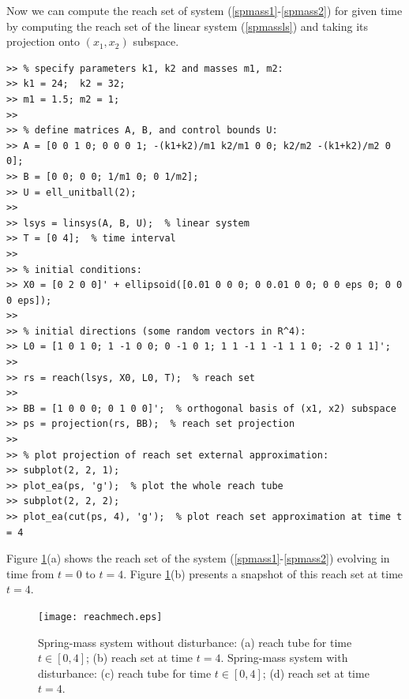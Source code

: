 \documentclass{report}
\begin{document}
Now we can compute the reach set of system (\ref{spmass1}-\ref{spmass2})
for given time by computing the reach set of the linear system (\ref{spmassls})
and taking its projection onto $(x_1, x_2)$ subspace.
{\tt \begin{verbatim}
>> % specify parameters k1, k2 and masses m1, m2:
>> k1 = 24;  k2 = 32;
>> m1 = 1.5; m2 = 1;
>>
>> % define matrices A, B, and control bounds U:
>> A = [0 0 1 0; 0 0 0 1; -(k1+k2)/m1 k2/m1 0 0; k2/m2 -(k1+k2)/m2 0 0];
>> B = [0 0; 0 0; 1/m1 0; 0 1/m2];
>> U = ell_unitball(2);
>>
>> lsys = linsys(A, B, U);  % linear system
>> T = [0 4];  % time interval
>>
>> % initial conditions:
>> X0 = [0 2 0 0]' + ellipsoid([0.01 0 0 0; 0 0.01 0 0; 0 0 eps 0; 0 0 0 eps]);
>>
>> % initial directions (some random vectors in R^4):
>> L0 = [1 0 1 0; 1 -1 0 0; 0 -1 0 1; 1 1 -1 1 -1 1 1 0; -2 0 1 1]';
>>
>> rs = reach(lsys, X0, L0, T);  % reach set
>>
>> BB = [1 0 0 0; 0 1 0 0]';  % orthogonal basis of (x1, x2) subspace
>> ps = projection(rs, BB);  % reach set projection
>>
>> % plot projection of reach set external approximation:
>> subplot(2, 2, 1);
>> plot_ea(ps, 'g');  % plot the whole reach tube
>> subplot(2, 2, 2);
>> plot_ea(cut(ps, 4), 'g');  % plot reach set approximation at time t = 4
\end{verbatim}}
Figure \ref{mechreachfig}(a) shows the reach set of the system
(\ref{spmass1}-\ref{spmass2}) evolving in time from $t=0$ to $t=4$.
Figure \ref{mechreachfig}(b) presents a snapshot of this reach set at time
$t=4$.
\begin{figure}%
\centerline{
\texttt{[image: reachmech.eps]}}
\caption{Spring-mass system without disturbance:
(a) reach tube for time $t\in[0,4]$; (b) reach set at time $t=4$.
Spring-mass system with disturbance:
(c) reach tube for time $t\in[0,4]$; (d) reach set at time $t=4$.}
\label{mechreachfig}
\end{figure}
\end{document}
